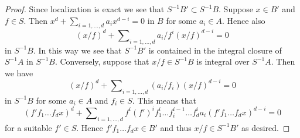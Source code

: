 \documentclass[10pt,a4paper]{amsart}
\theoremstyle{plain}
\theoremstyle{definition}
\theoremstyle{remark}
\numberwithin{equation}{subsection}
\begin{document}
\begin{proof}
Since localization is exact we see that $S^{-1}B' \subset S^{-1}B$.
Suppose $x \in B'$ and $f \in S$. Then
$x^d + \sum_{i = 1, \ldots, d} a_i x^{d - i} = 0$
in $B$ for some $a_i \in A$. Hence also
$$
(x/f)^d + \sum\nolimits_{i = 1, \ldots, d} a_i/f^i (x/f)^{d - i} = 0
$$
in $S^{-1}B$. In this way we see that $S^{-1}B'$ is contained in
the integral closure of $S^{-1}A$ in $S^{-1}B$. Conversely, suppose
that $x/f \in S^{-1}B$ is integral over $S^{-1}A$. Then we have
$$
(x/f)^d + \sum\nolimits_{i = 1, \ldots, d} (a_i/f_i) (x/f)^{d - i} = 0
$$
in $S^{-1}B$ for some $a_i \in A$ and $f_i \in S$. This means that
$$
(f'f_1 \ldots f_d x)^d +
\sum\nolimits_{i = 1, \ldots, d}
f^i(f')^if_1^i \ldots f_i^{i - 1} \ldots f_d^i a_i
(f'f_1 \ldots f_dx)^{d - i} = 0
$$
for a suitable $f' \in S$. Hence $f'f_1\ldots f_dx \in B'$ and thus
$x/f \in S^{-1}B'$ as desired.
\end{proof}
\end{document}
